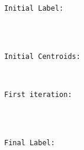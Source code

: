 \documentclass[11pt]{article}
\begin{document}
    \begin{Verbatim}[commandchars=\\\{\}]

Initial Label:

    \end{Verbatim}

    \begin{center}
    \end{center}
    { \hspace*{\fill} \\}
    
    \begin{Verbatim}[commandchars=\\\{\}]

Initial Centroids:

    \end{Verbatim}

    \begin{center}
    \end{center}
    { \hspace*{\fill} \\}
    
    \begin{Verbatim}[commandchars=\\\{\}]
First iteration:

    \end{Verbatim}

    \begin{center}
    \end{center}
    { \hspace*{\fill} \\}
    
    \begin{Verbatim}[commandchars=\\\{\}]

Final Label:

    \end{Verbatim}

    \begin{center}
    \end{center}
    { \hspace*{\fill} \\}
    
\end{document}
